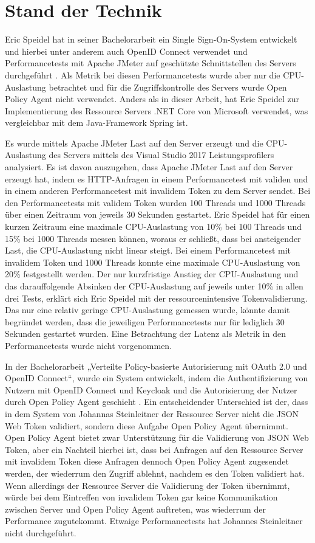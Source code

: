 \chapter{Stand der Technik}
Eric Speidel hat in seiner Bachelorarbeit ein Single Sign-On-System entwickelt und hierbei unter anderem auch OpenID Connect verwendet und Performancetests mit Apache JMeter auf geschützte Schnittstellen des Servers durchgeführt \citep{speidel:2017}. Als Metrik bei diesen Performancetests wurde aber nur die CPU-Auslastung betrachtet und für die Zugriffskontrolle des Servers wurde Open Policy Agent nicht verwendet. Anders als in dieser Arbeit, hat Eric Speidel zur Implementierung des Ressource Servers .NET Core von Microsoft verwendet, was vergleichbar mit dem Java-Framework Spring ist.\smallskip

Es wurde mittels Apache JMeter Last auf den Server erzeugt und die CPU-Auslastung des Servers mittels des Visual Studio 2017 Leistungsprofilers analysiert. Es ist davon auszugehen, dass Apache JMeter Last auf den Server erzeugt hat, indem es HTTP-Anfragen in einem Performancetest mit validen und in einem anderen Performancetest mit invalidem Token zu dem Server sendet. Bei den Performancetests mit validem Token wurden 100 Threads und 1000 Threads über einen Zeitraum von jeweils 30 Sekunden gestartet. Eric Speidel hat für einen kurzen Zeitraum eine maximale CPU-Auslastung von 10\% bei 100 Threads und 15\% bei 1000 Threads messen können, woraus er schließt, dass bei ansteigender Last, die CPU-Auslastung nicht linear steigt. Bei einem Performancetest mit invalidem Token und 1000 Threads konnte eine maximale CPU-Auslastung von 20\% festgestellt werden. Der nur kurzfristige Anstieg der CPU-Auslastung und das darauffolgende Absinken der CPU-Auslastung auf jeweils unter 10\% in allen drei Tests, erklärt sich Eric Speidel mit der ressourcenintensive Tokenvalidierung. Das nur eine relativ geringe CPU-Auslastung gemessen wurde, könnte damit begründet werden, dass die jeweiligen Performancetests nur für lediglich 30 Sekunden gestartet wurden. Eine Betrachtung der Latenz als Metrik in den Performancetests wurde nicht vorgenommen.\bigskip

In der Bachelorarbeit „Verteilte Policy-basierte Autorisierung mit OAuth 2.0 und OpenID Connect“, wurde ein System entwickelt, indem die Authentifizierung von Nutzern mit OpenID Connect und Keycloak und die Autorisierung der Nutzer durch Open Policy Agent geschieht \citep{steinleitner:2020}. Ein entscheidender Unterschied ist der, dass in dem System von Johannas Steinleitner der Ressource Server nicht die JSON Web Token validiert, sondern diese Aufgabe Open Policy Agent übernimmt. Open Policy Agent bietet zwar Unterstützung für die Validierung von JSON Web Token, aber ein Nachteil hierbei ist, dass bei Anfragen auf den Ressource Server mit invalidem Token diese Anfragen dennoch Open Policy Agent zugesendet werden, der wiederrum den Zugriff ablehnt, nachdem es den Token validiert hat. Wenn allerdings der Ressource Server die Validierung der Token übernimmt, würde bei dem Eintreffen von invalidem Token gar keine Kommunikation zwischen Server und Open Policy Agent auftreten, was wiederrum der Performance zugutekommt. Etwaige Performancetests hat Johannes Steinleitner nicht durchgeführt.\bigskip

